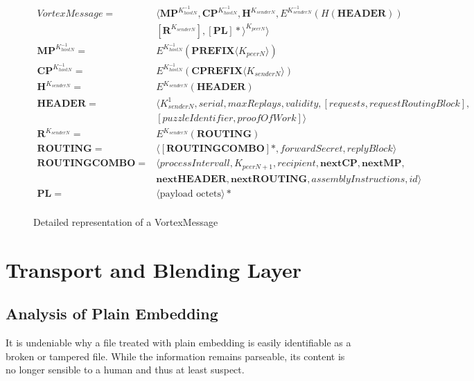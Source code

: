 \begin{figure}[!ht]
	\begin{align}
	VortexMessage                = &\langle \mathbf{MP}^{K^{-1}_{hostN}}, \mathbf{CP}^{K^{-1}_{hostN}}, \mathbf{H}^{K_{senderN}}, E^{K^{-1}_{senderN}}\left(H\left(\mathbf{HEADER}\right)\right)  \nonumber \\
	& \left[\mathbf{R}^{K_{senderN}}\right], \left[\mathbf{PL}\right]*\rangle^{K_{peerN}} \rangle\label{eq:vortexMessage}\\ 
	\mathbf{MP}^{K^{-1}_{hostN}} = &E^{K^{-1}_{hostN}}\left(\mathbf{PREFIX}\langle K_{peerN}\rangle \right)\\ 
	\mathbf{CP}^{K^{-1}_{hostN}} = &E^{K^{-1}_{hostN}}\left(\mathbf{CPREFIX}\langle K_{senderN}\rangle \right)\\ 
	\mathbf{H}^{K_{senderN}}     = &E^{K_{senderN}}\left(\mathbf{HEADER}\right)\\  
	\mathbf{HEADER}              = &\langle K^{1}_{senderN}, serial, maxReplays, validity, [requests, requestRoutingBlock],\nonumber\\ 
	& [puzzleIdentifier, proofOfWork] \rangle \\  
	\mathbf{R}^{K_{senderN}}     = & E^{K_{senderN}}\left(\mathbf{ROUTING}\right)\\ 
	\mathbf{ROUTING}             = & \langle [ \mathbf{ROUTINGCOMBO} ] *, forwardSecret, replyBlock \rangle\\  
	\mathbf{ROUTINGCOMBO}        = & \langle processIntervall, K_{peerN+1}, recipient, \mathbf{nextCP}, \mathbf{nextMP}, \nonumber \\
	& \mathbf{nextHEADER}, \mathbf{nextROUTING}, assemblyInstructions, id \rangle\\
	\mathbf{PL}                  = &\langle \text{payload octets} \rangle *\\ 
	\end{align}
	\caption{Detailed representation of a VortexMessage}
\end{figure}

\section{Transport and Blending Layer}

\subsection{Analysis of Plain Embedding}
It is undeniable why a file treated with plain embedding is easily identifiable as a broken or tampered file. While the information remains parseable, its content is no longer sensible to a human and thus at least suspect. 

